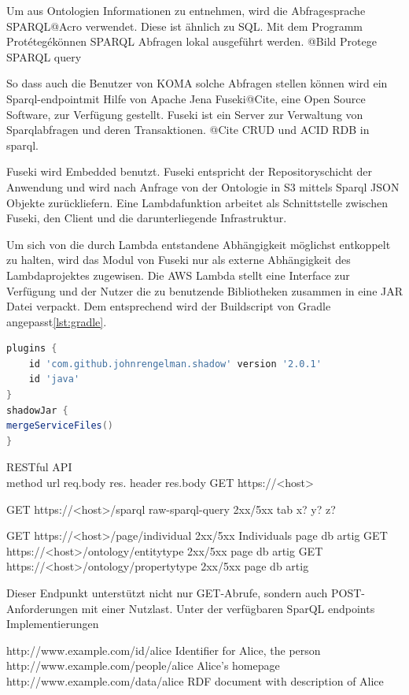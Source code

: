 \documentclass[
12pt,
english,
ngerman,
headsepline,
twoside,
openright,
numbers=noenddot,version=first
]{scrreprt}
\begin{document}
Um aus Ontologien Informationen zu entnehmen, wird die Abfragesprache \glqq SPARQL\grqq @Acro verwendet. Diese ist ähnlich zu SQL. Mit dem Programm \glqq Protétegé\grqq können SPARQL Abfragen lokal ausgeführt werden.
@Bild Protege SPARQL query

So dass auch die Benutzer von KOMA solche Abfragen stellen können wird ein \glqq Sparql-endpoint\grqq mit Hilfe von Apache Jena Fuseki@Cite, eine Open Source Software, zur Verfügung gestellt. Fuseki ist ein Server zur Verwaltung von Sparqlabfragen und deren Transaktionen. @Cite CRUD und ACID RDB in sparql.


Fuseki wird Embedded benutzt.
Fuseki entspricht der Repositoryschicht der Anwendung und wird nach Anfrage von der Ontologie in S3 mittels Sparql JSON Objekte zurückliefern.
Eine Lambdafunktion arbeitet als Schnittstelle zwischen Fuseki, den Client und die darunterliegende Infrastruktur.

Um sich von die durch Lambda entstandene Abhängigkeit möglichst entkoppelt\cite{FlowerRefactoring} zu halten, wird das Modul von Fuseki nur als externe Abhängigkeit des Lambdaprojektes zugewisen.
Die AWS Lambda stellt eine Interface zur Verfügung und der Nutzer die zu benutzende Bibliotheken zusammen in eine JAR Datei verpackt. Dem entsprechend wird der Buildscript von Gradle\cite{Muschko2014} angepasst\autoref{lst:gradle}. 

\begin{lstlisting}[language=Groovy,caption={Abhängigkeitenverwaltung für Lambda in Java},label={lst:gradle}]
plugins {
	id 'com.github.johnrengelman.shadow' version '2.0.1'
	id 'java'
}
shadowJar {
mergeServiceFiles()
}

\end{lstlisting}


RESTful API \\
method url req.body res. header res.body
GET https://<host>

GET https://<host>/sparql raw-sparql-query 2xx/5xx tab x? y? z?

GET https://<host>/page/individual 2xx/5xx Individuals page db artig\cite{Hunter2017}
GET https://<host>/ontology/entitytype 2xx/5xx page db artig
GET https://<host>/ontology/propertytype 2xx/5xx page db artig

Dieser Endpunkt unterstützt nicht nur GET-Abrufe, sondern auch POST-Anforderungen mit einer Nutzlast.
Unter der verfügbaren SparQL endpoints Implementierungen


http://www.example.com/id/alice
Identifier for Alice, the person
http://www.example.com/people/alice
Alice's homepage
http://www.example.com/data/alice
RDF document with description of Alice
\end{document}
